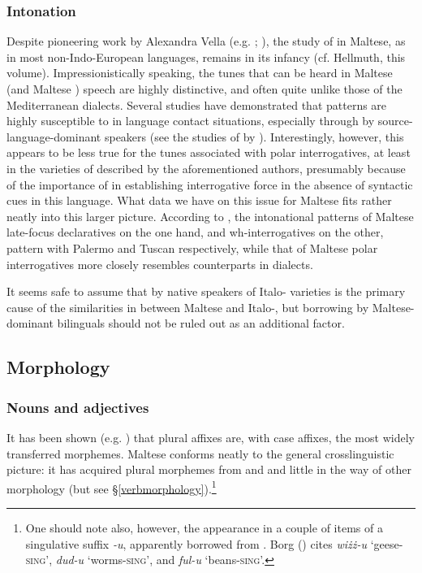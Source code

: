 \documentclass[output=paper]{langsci/langscibook}
\begin{document}
\subsubsection{Intonation}
Despite pioneering work by Alexandra Vella (e.g. \citealt{Vella1994,vella2003,Vella2009}; \citealt{GriceVellaBruggeman2019}), the study of  in Maltese, as in most non-Indo-European languages, remains in its infancy (cf. Hellmuth, this volume). Impressionistically speaking, the tunes that can be heard in Maltese (and Maltese ) speech are highly distinctive, and often quite unlike those of the Mediterranean  dialects. Several studies have demonstrated that  patterns are highly susceptible to  in language contact situations, especially through  by source-language-dominant speakers (see the studies of   by \citealt{orourke2005,gabrielkireva2014}). Interestingly, however, this appears to be less true for the tunes associated with polar interrogatives, at least in the varieties of  described by the aforementioned authors, presumably because of the importance of  in establishing interrogative force in the absence of syntactic cues in this language. What data we have on this issue for Maltese fits rather neatly into this larger picture. According to \cite{vella2003}, the intonational patterns of Maltese late-focus declaratives on the one hand, and wh-interrogatives on the other, pattern with Palermo  and Tuscan  respectively, while that of Maltese polar interrogatives more closely resembles counterparts in  dialects.

It seems safe to assume that  by native speakers of Italo- varieties is the primary cause of the similarities in  between Maltese and Italo-, but borrowing by Maltese-dominant bilinguals should not be ruled out as an additional factor.

\subsection{Morphology}
\subsubsection{Nouns and adjectives}
 \label{inflection}
It has been shown (e.g. \citealt{Gardani2012,Seifart2017}) that plural affixes are, with case affixes, the most widely transferred  morphemes. Maltese conforms neatly to the general crosslinguistic picture: it has acquired plural morphemes from  and  and little in the way of other  morphology (but see §\ref{verbmorphology}).\footnote{One should note also, however, the appearance in a couple of items of a singulative suffix \textit{-u}, apparently borrowed from . Borg (\citeyear[57]{Borg1994}) cites \textit{wiżż-u} `geese-\textsc{sing}', \textit{dud-u} `worms-\textsc{sing}', and \textit{ful-u} `beans-\textsc{sing}'.}
\end{document}
